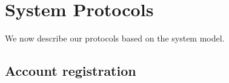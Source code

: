 

\section{System Protocols}
We now describe our protocols based on the system model. 

\subsection{Account registration}

